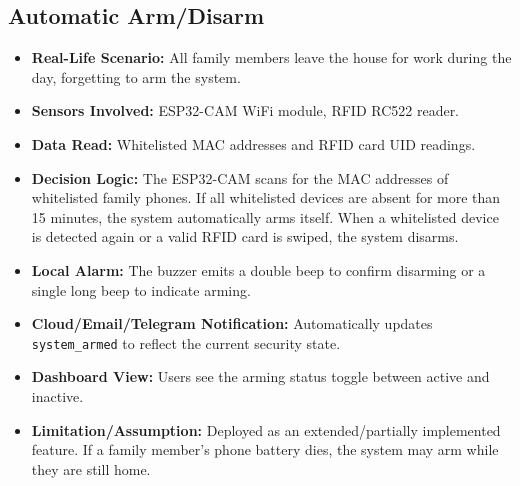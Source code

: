 \documentclass[11pt,a4paper]{report}
\begin{document}
\subsection{Automatic Arm/Disarm}
\begin{itemize}
    \item \textbf{Real-Life Scenario:} All family members leave the house for work during the day, forgetting to arm the system.
    \item \textbf{Sensors Involved:} ESP32-CAM WiFi module, RFID RC522 reader.
    \item \textbf{Data Read:} Whitelisted MAC addresses and RFID card UID readings.
    \item \textbf{Decision Logic:} The ESP32-CAM scans for the MAC addresses of whitelisted family phones. If all whitelisted devices are absent for more than 15 minutes, the system automatically arms itself. When a whitelisted device is detected again or a valid RFID card is swiped, the system disarms.
    \item \textbf{Local Alarm:} The buzzer emits a double beep to confirm disarming or a single long beep to indicate arming.
    \item \textbf{Cloud/Email/Telegram Notification:} Automatically updates \texttt{system\_armed} to reflect the current security state.
    \item \textbf{Dashboard View:} Users see the arming status toggle between active and inactive.
    \item \textbf{Limitation/Assumption:} Deployed as an extended/partially implemented feature. If a family member's phone battery dies, the system may arm while they are still home.
\end{itemize}
\end{document}
